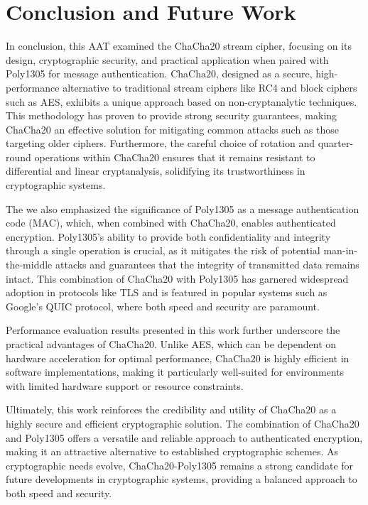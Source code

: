 \documentclass[a4paper,12pt]{report}
\begin{document}
\chapter{Conclusion and Future Work}

In conclusion, this AAT examined the ChaCha20 stream cipher, focusing on its design, cryptographic security, and practical application when paired with Poly1305 for message authentication.
ChaCha20, designed as a secure, high-performance alternative to traditional stream ciphers like RC4 and block ciphers such as AES, exhibits a unique approach based on non-cryptanalytic techniques.
This methodology has proven to provide strong security guarantees, making ChaCha20 an effective solution for mitigating common attacks such as those targeting older ciphers.
Furthermore, the careful choice of rotation and quarter-round operations within ChaCha20 ensures that it remains resistant to differential and linear cryptanalysis, solidifying its trustworthiness in cryptographic systems.

The we also emphasized the significance of Poly1305 as a message authentication code (MAC), which, when combined with ChaCha20, enables authenticated encryption.
Poly1305's ability to provide both confidentiality and integrity through a single operation is crucial, as it mitigates the risk of potential man-in-the-middle attacks and guarantees that the integrity of transmitted data remains intact.
This combination of ChaCha20 with Poly1305 has garnered widespread adoption in protocols like TLS and is featured in popular systems such as Google's QUIC protocol, where both speed and security are paramount.

Performance evaluation results presented in this work further underscore the practical advantages of ChaCha20.
Unlike AES, which can be dependent on hardware acceleration for optimal performance, ChaCha20 is highly efficient in software implementations, making it particularly well-suited for environments with limited hardware support or resource constraints.

Ultimately, this work reinforces the credibility and utility of ChaCha20 as a highly secure and efficient cryptographic solution.
The combination of ChaCha20 and Poly1305 offers a versatile and reliable approach to authenticated encryption, making it an attractive alternative to established cryptographic schemes.
As cryptographic needs evolve, ChaCha20-Poly1305 remains a strong candidate for future developments in cryptographic systems, providing a balanced approach to both speed and security\cite{duck_ai}.

\fontsize{12}{8}\selectfont


\end{document}
